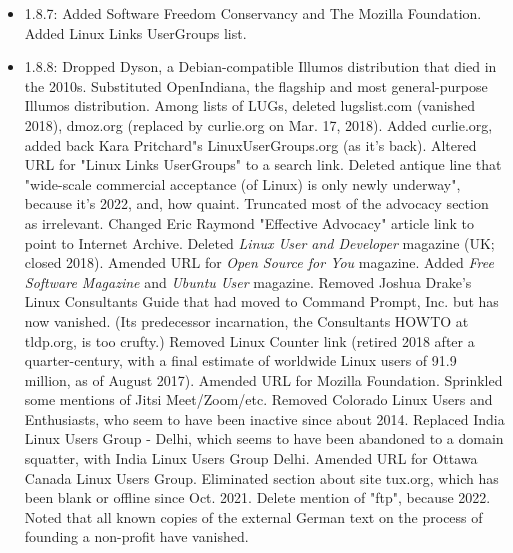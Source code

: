 \begin{itemize}
\item 1.8.7:  Added Software Freedom Conservancy and The Mozilla
Foundation.  Added Linux Links UserGroups list.
\item 1.8.8:  Dropped Dyson, a Debian-compatible Illumos
distribution that died in the 2010s.  Substituted OpenIndiana, the
flagship and most general-purpose Illumos distribution.  Among lists of
LUGs, deleted lugslist.com (vanished 2018), dmoz.org (replaced by
curlie.org on Mar. 17, 2018).  Added curlie.org, added back Kara Pritchard"s 
LinuxUserGroups.org (as it's back).  Altered URL for "Linux Links
UserGroups" to a search link.  Deleted antique line that "wide-scale commercial acceptance 
(of Linux) is only newly underway", because it's 2022, and, how quaint.  Truncated most 
of the advocacy section as irrelevant.  Changed Eric Raymond "Effective Advocacy" article 
link to point to Internet Archive.
Deleted {\itshape Linux User and Developer\/} magazine (UK; closed 2018). Amended URL for 
{\itshape Open Source for You\/} magazine.  Added {\itshape Free Software Magazine\/} and 
{\itshape Ubuntu User\/} magazine.  Removed 
Joshua Drake's Linux Consultants Guide that had moved to Command Prompt, Inc. but
has now vanished.  (Its predecessor incarnation, the Consultants HOWTO at tldp.org, 
is too crufty.)  Removed Linux Counter link (retired 2018 after a quarter-century, 
with a final estimate of worldwide Linux users of 91.9 million, as of August 2017).
Amended URL for Mozilla Foundation.  Sprinkled some mentions of Jitsi Meet/Zoom/etc.
Removed Colorado Linux Users and Enthusiasts, who seem to have been inactive since 
about 2014.  Replaced India Linux Users Group - Delhi, which seems to have been abandoned 
to a domain squatter, with India Linux Users Group Delhi.  Amended URL for Ottawa 
Canada Linux Users Group.  Eliminated section about site tux.org, which has been blank
or offline since Oct. 2021.  Delete mention of "ftp", because 2022.  Noted that 
all known copies of the external German text on the process of founding a non-profit have 
vanished.
\end{itemize}


